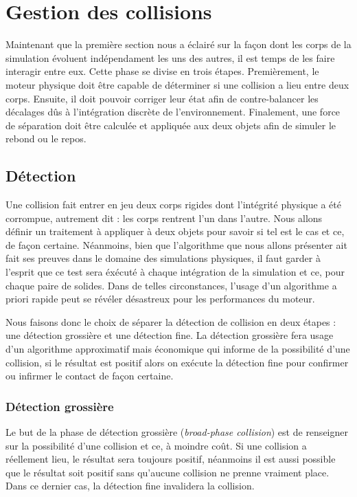 \section{Gestion des collisions}

Maintenant que la première section nous a éclairé sur la façon dont
les corps de la simulation évoluent indépendament les uns des autres,
il est temps de les faire interagir entre eux. Cette phase se divise
en trois étapes. Premièrement, le moteur physique doit être capable de
déterminer si une collision a lieu entre deux corps. Ensuite, il doit
pouvoir corriger leur état afin de contre-balancer les décalages dûs à
l'intégration discrète de l'environnement. Finalement, une force de
séparation doit être calculée et appliquée aux deux objets afin de
simuler le rebond ou le repos.

\subsection{Détection}

Une collision fait entrer en jeu deux corps rigides dont l'intégrité
physique a été corrompue, autrement dit : les corps rentrent l'un dans
l'autre. Nous allons définir un traitement à appliquer à deux objets
pour savoir si tel est le cas et ce, de façon certaine. Néanmoins,
bien que l'algorithme que nous allons présenter ait fait ses preuves
dans le domaine des simulations physiques, il faut garder à l'esprit
que ce test sera éxécuté à chaque intégration de la simulation et ce,
pour chaque paire de solides. Dans de telles circonstances, l'usage
d'un algorithme a priori rapide peut se révéler désastreux pour les
performances du moteur.

Nous faisons donc le choix de séparer la détection de collision en
deux étapes : une détection grossière et une détection fine. La
détection grossière fera usage d'un algorithme approximatif mais
économique qui informe de la possibilité d'une collision, si le
résultat est positif alors on exécute la détection fine pour confirmer
ou infirmer le contact de façon certaine.

\subsubsection{Détection grossière}

Le but de la phase de détection grossière (\textit{broad-phase
  collision}) est de renseigner sur la possibilité d'une collision et
ce, à moindre coût. Si une collision a réellement lieu, le résultat
sera toujours positif, néanmoins il est aussi possible que le résultat
soit positif sans qu'aucune collision ne prenne vraiment place. Dans
ce dernier cas, la détection fine invalidera la collision.

